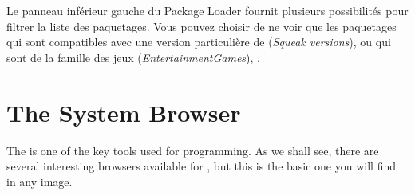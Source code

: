 \documentclass[a4paper,10pt,twoside]{book}
\begin{document}


Le panneau inf\'erieur gauche du \sqmap Package Loader fournit
plusieurs possibilit\'es pour filtrer la liste des paquetages. Vous
pouvez choisir de ne voir que les paquetages qui sont compatibles avec
une version particuli\`ere de \sq
(\emph{Squeak versions}), 
ou qui sont de la famille des jeux
(\emph{Entertainment\go{}Games}), 
\etc.

\section{The System Browser}

The  is one of the key tools used for programming.
As we shall see, there are several interesting browsers available for \sq, but this is the basic one you will find in any image.

\end{document}
